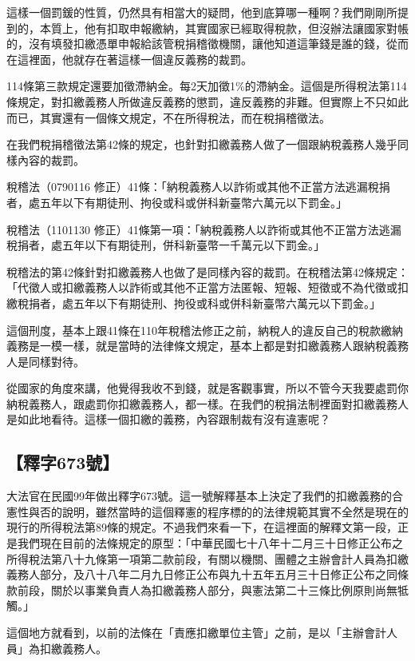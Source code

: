 \documentclass[oneside,sub3section]{ctexbook}
\begin{document}
這樣一個罰鍰的性質，仍然具有相當大的疑問，他到底算哪一種啊？我們剛剛所提到的，本質上，他有扣取申報繳納，其實國家已經取得稅款，但沒辦法讓國家對帳的，沒有填發扣繳憑單申報給該管稅捐稽徵機關，讓他知道這筆錢是誰的錢，從而在這裡面，他就存在著這樣一個違反義務的裁罰。

114條第三款規定還要加徵滯納金。每2天加徵1\%的滯納金。這個是所得稅法第114條規定，對扣繳義務人所做違反義務的懲罰，違反義務的非難。但實際上不只如此而已，其實還有一個條文規定，不在所得稅法，而在稅捐稽徵法。

在我們稅捐稽徵法第42條的規定，也針對扣繳義務人做了一個跟納稅義務人幾乎同樣內容的裁罰。

稅稽法（0790116 修正）41條：「納稅義務人以詐術或其他不正當方法逃漏稅捐者，處五年以下有期徒刑、拘役或科或併科新臺幣六萬元以下罰金。」

稅稽法（1101130 修正）41條第一項：「納稅義務人以詐術或其他不正當方法逃漏稅捐者，處五年以下有期徒刑，併科新臺幣一千萬元以下罰金。」

稅稽法的第42條針對扣繳義務人也做了是同樣內容的裁罰。在稅稽法第42條規定：「代徵人或扣繳義務人以詐術或其他不正當方法匿報、短報、短徵或不為代徵或扣繳稅捐者，處五年以下有期徒刑、拘役或科或併科新臺幣六萬元以下罰金。」

這個刑度，基本上跟41條在110年稅稽法修正之前，納稅人的違反自己的稅款繳納義務是一模一樣，就是當時的法律條文規定，基本上都是對扣繳義務人跟納稅義務人是同樣對待。

從國家的角度來講，他覺得我收不到錢，就是客觀事實，所以不管今天我要處罰你納稅義務人，跟處罰你扣繳義務人，都一樣。在我們的稅捐法制裡面對扣繳義務人是如此地看待。這樣一個扣繳的義務，內容跟制裁有沒有違憲呢？

\hypertarget{ux91cbux5b57673ux865f}{%
\subsection{【釋字673號】}\label{ux91cbux5b57673ux865f}}

大法官在民國99年做出釋字673號。這一號解釋基本上決定了我們的扣繳義務的合憲性與否的說明，雖然當時的這個釋憲的程序標的的法律規範其實不全然是現在的現行的所得稅法第89條的規定。不過我們來看一下，在這裡面的解釋文第一段，正是我們現在目前的法條規定的原型：「中華民國七十八年十二月三十日修正公布之所得稅法第八十九條第一項第二款前段，有關以機關、團體之主辦會計人員為扣繳義務人部分，及八十八年二月九日修正公布與九十五年五月三十日修正公布之同條款前段，關於以事業負責人為扣繳義務人部分，與憲法第二十三條比例原則尚無牴觸。」

這個地方就看到，以前的法條在「責應扣繳單位主管」之前，是以「主辦會計人員」為扣繳義務人。
\end{document}
